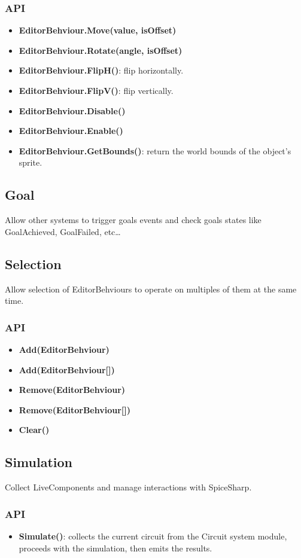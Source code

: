 \documentclass[../main.tex]{subfiles}
\begin{document}
\subsubsection*{API}
\begin{itemize}
    \item \textbf{EditorBehviour.Move(value, isOffset)}
    \item \textbf{EditorBehviour.Rotate(angle, isOffset)}
    \item \textbf{EditorBehviour.FlipH()}: flip horizontally.
    \item \textbf{EditorBehviour.FlipV()}: flip vertically.
    \item \textbf{EditorBehviour.Disable()}
    \item \textbf{EditorBehviour.Enable()}
    \item \textbf{EditorBehviour.GetBounds()}: return the world bounds of the object's sprite.
\end{itemize}

\subsection{Goal}
Allow other systems to trigger goals events and check goals states like GoalAchieved, GoalFailed, etc\dots
\subsection{Selection}
Allow selection of EditorBehviours to operate on multiples of them at the same time.
\subsubsection*{API}
\begin{itemize}
    \item \textbf{Add(EditorBehviour)}
    \item \textbf{Add(EditorBehviour[])}
    \item \textbf{Remove(EditorBehviour)}
    \item \textbf{Remove(EditorBehviour[])}
    \item \textbf{Clear()}
    
\end{itemize}
\subsection{Simulation}
Collect LiveComponents and manage interactions with SpiceSharp.
\subsubsection*{API}
\begin{itemize}
    \item \textbf{Simulate()}: collects the current circuit from the Circuit system module, proceeds with the simulation, then emits the results.
\end{itemize}
\end{document}
